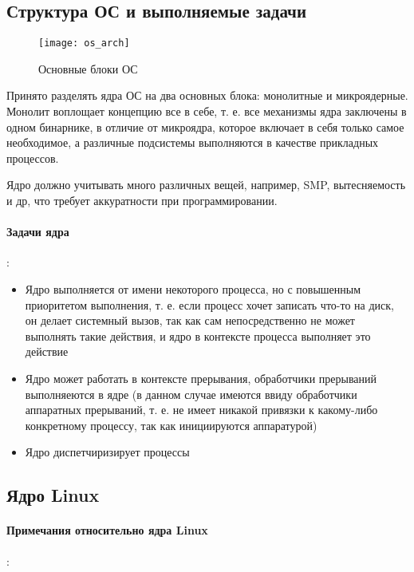 \subsection{Структура ОС и выполняемые задачи}

\begin{figure}
\texttt{[image: os\_arch]}
\caption{Основные блоки ОС}
\label{img::les1::os_arch}
\end{figure}

Принято разделять ядра ОС на два основных блока: монолитные и микроядерные. Монолит воплощает концепцию все в себе, т. е. все
механизмы ядра заключены в одном бинарнике, в отличие от микроядра, которое включает в себя только самое необходимое, а различные
подсистемы выполняются в качестве прикладных процессов.

Ядро должно учитывать много различных вещей, например, SMP, вытесняемость и др, что требует аккуратности при программировании.

\paragraph{Задачи ядра}:

\begin{itemize}
\item Ядро выполняется от имени некоторого процесса, но с повышенным приоритетом выполнения, т. е. если процесс хочет записать
что-то на диск, он делает системный вызов, так как сам непосредственно не может выполнять такие действия, и ядро в контексте
процесса выполняет это действие

\item Ядро может работать в контексте прерывания, обработчики прерываний выполняеются в ядре (в данном случае имеются ввиду
обработчики аппаратных прерываний, т. е. не имеет никакой привязки к какому-либо конкретному процессу, так как инициируются
аппаратурой)

\item Ядро диспетчиризирует процессы
\end{itemize}

\subsection{Ядро Linux}

\paragraph{Примечания относительно ядра Linux}:

